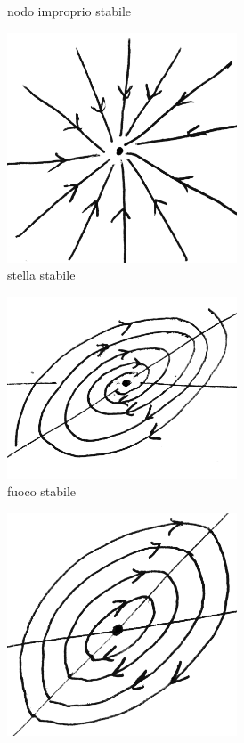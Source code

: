 \documentclass[italian,a4paper]{scrartcl}
\begin{document}
\begin{figure}
\begin{subfigure}{5cm}
  \caption{nodo improprio stabile}
 \end{subfigure}
 \begin{subfigure}{5cm}
  \includegraphics[width=0.75\textwidth]{sistemi_stella.png}
  \caption{stella stabile}
 \end{subfigure}
 \begin{subfigure}{5cm}
  \includegraphics[width=0.75\textwidth]{sistemi_fuoco.png}
  \caption{fuoco stabile}
 \end{subfigure}
 \begin{subfigure}{5cm}
  \includegraphics[width=0.75\textwidth]{sistemi_centro.png}

\end{subfigure}
\end{figure}
\end{document}
